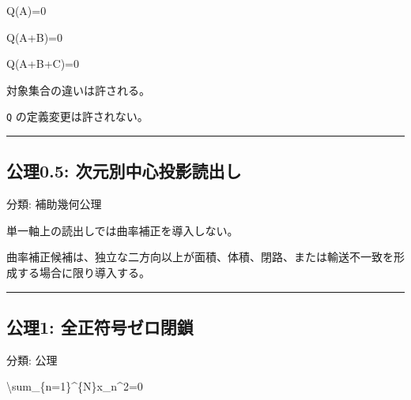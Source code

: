 \documentclass[
  a4paper]{ltjsarticle}
\newenvironment{Shaded}{}{}
\newcommand{\NormalTok}[1]{#1}
\begin{document}
\begin{Shaded}
\begin{Highlighting}[]
\NormalTok{Q(A)=0}
\end{Highlighting}
\end{Shaded}

\begin{Shaded}
\begin{Highlighting}[]
\NormalTok{Q(A+B)=0}
\end{Highlighting}
\end{Shaded}

\begin{Shaded}
\begin{Highlighting}[]
\NormalTok{Q(A+B+C)=0}
\end{Highlighting}
\end{Shaded}

対象集合の違いは許される。

\texttt{Q} の定義変更は許されない。

\begin{center}\rule{0.5\linewidth}{0.5pt}\end{center}

\subsection{公理0.5:
次元別中心投影読出し}\label{ux516cux74060.5-ux6b21ux5143ux5225ux4e2dux5fc3ux6295ux5f71ux8aadux51faux3057}

分類: 補助幾何公理

単一軸上の読出しでは曲率補正を導入しない。

曲率補正候補は、独立な二方向以上が面積、体積、閉路、または輸送不一致を形成する場合に限り導入する。

\begin{center}\rule{0.5\linewidth}{0.5pt}\end{center}

\subsection{公理1:
全正符号ゼロ閉鎖}\label{ux516cux74061-ux5168ux6b63ux7b26ux53f7ux30bcux30edux9589ux9396}

分類: 公理

\begin{Shaded}
\begin{Highlighting}[]
\NormalTok{\textbackslash{}sum\_\{n=1\}\^{}\{N\}x\_n\^{}2=0}
\end{Highlighting}
\end{Shaded}
\end{document}
